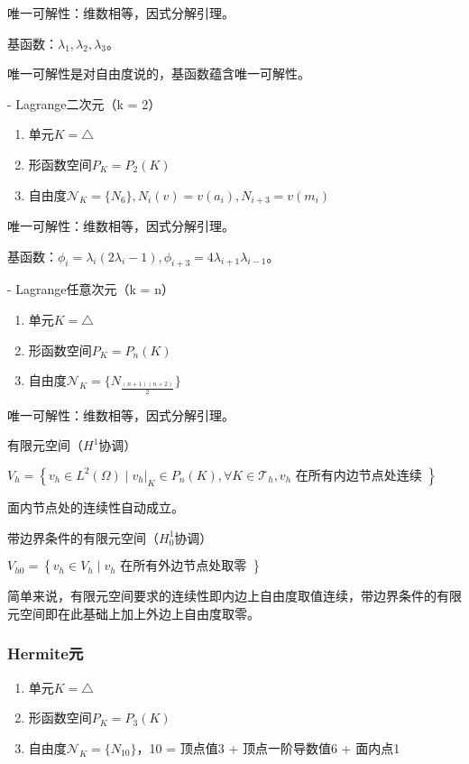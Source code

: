 唯一可解性：维数相等，因式分解引理。

基函数：$\lambda_1, \lambda_2, \lambda_3$。

唯一可解性是对自由度说的，基函数蕴含唯一可解性。

- Lagrange二次元（k = 2）
\begin{enumerate}
  \item 单元$K = \triangle$
  \item 形函数空间$P_K = P_2(K)$
  \item 自由度$\mathcal{N}_K = \{N_{6}\}, N_i(v) = v(a_i), N_{i + 3} = v(m_i)$
\end{enumerate}

唯一可解性：维数相等，因式分解引理。

基函数：$\phi_i = \lambda_i(2\lambda_i - 1), \phi_{i + 3} = 4\lambda_{i + 1}\lambda_{i - 1}$。

- Lagrange任意次元（k = n）
\begin{enumerate}
  \item 单元$K = \triangle$
  \item 形函数空间$P_K = P_n(K)$
  \item 自由度$\mathcal{N}_K = \{N_{\frac{(n + 1)(n + 2)}{2}}\}$
\end{enumerate}

唯一可解性：维数相等，因式分解引理。

有限元空间（$H^1$协调）

$V_{h}=\left\{v_h \in L^{2}(\Omega) \mid v_h|_{K} \in P_{n}(K), \forall K \in \mathcal{T}_{h}, v_h \text { 在所有内边节点处连续 }\right\}$

面内节点处的连续性自动成立。

带边界条件的有限元空间（$H_0^1$协调）

$V_{h 0}=\left\{v_h \in V_{h} \mid v_h \text { 在所有外边节点处取零 }\right\}$

简单来说，有限元空间要求的连续性即内边上自由度取值连续，带边界条件的有限元空间即在此基础上加上外边上自由度取零。

\subsubsection{Hermite元}

\begin{enumerate}
  \item 单元$K = \triangle$
  \item 形函数空间$P_K = P_3(K)$
  \item 自由度$\mathcal{N}_K = \{N_{10}\}$，10 = 顶点值3 + 顶点一阶导数值6 + 面内点1
\end{enumerate}

